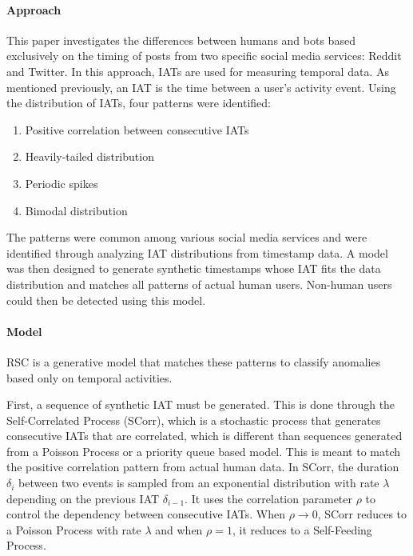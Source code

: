 \documentclass[11pt, oneside]{article}   	%
\begin{document}
\paragraph{Approach}
\quad

\quad This paper investigates the differences between humans and bots based exclusively on the timing of posts from two specific social media services: Reddit and Twitter. In this approach,\cite{rsc}
IATs are used for measuring temporal data. As mentioned previously, an IAT is the time between a user's activity event.
Using the distribution of IATs, four patterns were identified:
\begin{enumerate}
	\item Positive correlation between consecutive IATs
	\item Heavily-tailed distribution
	\item Periodic spikes
	\item Bimodal distribution
\end{enumerate}
\quad The patterns were common among various social media services and were identified through analyzing IAT distributions from timestamp data.
A model was then designed to generate synthetic timestamps whose IAT fits the data distribution and matches all patterns of actual human users.
Non-human users could then be detected using this model.

\paragraph*{Model}
\quad

\quad RSC is a generative model that matches these patterns to classify anomalies based only on temporal activities.

\quad First, a sequence of synthetic IAT must be generated.
This is done through the Self-Correlated Process (SCorr), which is a stochastic process that generates consecutive IATs that are correlated, which is different than sequences generated from a Poisson Process or a priority queue based model.
This is meant to match the positive correlation pattern from actual human data.
In SCorr, the duration $\delta_i$ between two events is sampled from an exponential distribution with rate $\lambda$ depending on the previous IAT $\delta_{i-1}$. It uses the correlation parameter $\rho$ to control the dependency between consecutive IATs. When $\rho \rightarrow 0$, SCorr reduces to a Poisson Process with rate $\lambda$ and when $\rho = 1$, it reduces to a Self-Feeding Process.
\end{document}
